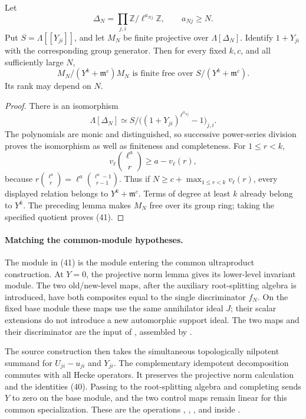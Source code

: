 \begin{srlemma}
\label{lem:aux-trunc-free}
Let
\[
 \Delta_N=\prod_{j,i}\mathbb Z/\ell^{a_{Nj}}\mathbb Z,
                     \qquad a_{Nj}\geq N.
\]
Put $S=\Lambda[[Y_{ji}]]$, and let $M_N$ be finite projective
over $\Lambda[\Delta_N]$.  Identify $1+Y_{ji}$ with the
corresponding group generator.  Then for every fixed $k,c$,
and all sufficiently large $N$,
\[
 M_N/(Y^k+\mathfrak m^c)M_N
       \text{ is finite free over }
                      S/(Y^k+\mathfrak m^c).
                                                               \tag{41}
\]
Its rank may depend on $N$.
\end{srlemma}
\begin{proof}
There is an isomorphism
\[
 \Lambda[\Delta_N]\simeq
 S/\bigl((1+Y_{ji})^{\ell^{a_{Nj}}}-1\bigr)_{j,i}.
\]
The polynomials are monic and distinguished, so successive
power-series division proves the isomorphism as well as
finiteness and completeness.
For $1\leq r<k$,
\[
 v_\ell\binom{\ell^a}{r}\geq a-v_\ell(r),
\]
because $r\binom{\ell^a}{r}=\ell^a
\binom{\ell^a-1}{r-1}$.
Thus if $N\geq c+\max_{1\leq r<k}v_\ell(r)$, every displayed
relation belongs to $Y^k+\mathfrak m^c$.
Terms of degree at least $k$ already belong to $Y^k$.
The preceding lemma makes $M_N$ free over its group ring;
taking the specified quotient proves (41).
\end{proof}

\paragraph{Matching the common-module hypotheses.}
The module in (41) is the module entering the common
ultraproduct construction.  At $Y=0$, the projective norm
lemma gives its lower-level invariant module.
The two old/new-level maps, after the auxiliary root-splitting
algebra is introduced, have both composites equal to the
single discriminator $f_N$.  On the fixed base module these
maps use the same annihilator ideal $J$; their scalar
extensions do not introduce a new automorphic support ideal.
The two maps and their discriminator are the
 input of , assembled by
.

The source construction then takes the simultaneous
topologically nilpotent summand for $U_{ji}-u_{ji}$ and
$Y_{ji}$.  The complementary idempotent decomposition
commutes with all Hecke operators.  It preserves the
projective norm calculation and the identities (40).
Passing to the root-splitting algebra and completing sends
$Y$ to zero on the base module, and the two control maps
remain linear for this common specialization.
These are the operations ,
, , and 
inside .

